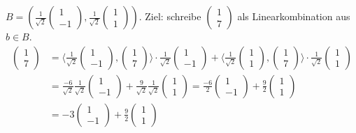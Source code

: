 \documentclass[12pt]{article}
\begin{document}
\begin{exercise}{}{}
    $B = \left(\frac{1}{\sqrt{2}}\begin{pmatrix} 1 \\ -1 \end{pmatrix}, \frac{1}{\sqrt{2}}\begin{pmatrix} 1 \\ 1 \end{pmatrix}\right)$. Ziel: schreibe $\begin{pmatrix} 1 \\ 7 \end{pmatrix}$ als Linearkombination aus $b \in B$.
    $$
    \begin{aligned}
        \begin{pmatrix} 1 \\ 7 \end{pmatrix} &= \langle \frac{1}{\sqrt{2}}\begin{pmatrix} 1 \\ -1 \end{pmatrix}, \begin{pmatrix} 1 \\ 7 \end{pmatrix} \rangle \cdot \frac{1}{\sqrt{2}}\begin{pmatrix} 1 \\ -1 \end{pmatrix} + \langle \frac{1}{\sqrt{2}}\begin{pmatrix} 1 \\ 1 \end{pmatrix}, \begin{pmatrix} 1 \\ 7 \end{pmatrix} \rangle \cdot \frac{1}{\sqrt{2}}\begin{pmatrix} 1 \\ 1 \end{pmatrix} \\
        &= \frac{-6}{\sqrt{2}} \frac{1}{\sqrt{2}}\begin{pmatrix} 1 \\ -1 \end{pmatrix} + \frac{9}{\sqrt{2}} \frac{1}{\sqrt{2}}\begin{pmatrix} 1 \\ 1 \end{pmatrix} = \frac{-6}{2}\begin{pmatrix} 1 \\ -1 \end{pmatrix} + \frac{9}{2} \begin{pmatrix} 1 \\ 1 \end{pmatrix} \\
        &= \boxed{-3 \begin{pmatrix} 1 \\ -1 \end{pmatrix} + \frac{9}{2} \begin{pmatrix} 1 \\ 1 \end{pmatrix}}
    \end{aligned}
    $$
\end{exercise}
\end{document}
